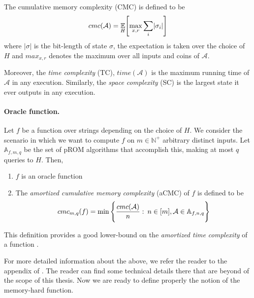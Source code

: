 The cumulative memory complexity (CMC) is defined to be
\begin{equation} \nonumber
    cmc(\mathcal{A}) = \underset{H}{\mathbb{E}} \Bigg{[} \underset{x,r}{\max} \sum_{i} \lvert \sigma_i \rvert \Bigg{]}
\end{equation}
where $\lvert \sigma \rvert$ is the bit-length of state $\sigma$, the expectation is taken over the choice of $H$ and $max_{x,r}$ denotes the maximum over all inputs and coins of $\mathcal{A}$.

Moreover, the \emph{time complexity} (TC), $time(\mathcal{A})$ is the maximum running time of $\mathcal{A}$ in any execution. Similarly, the \emph{space complexity} (SC) is the largest state it ever outputs in any execution.

\paragraph{Oracle function.} Let $f$ be a function over strings depending on the choice of $H$. We consider the scenario in which we want to compute $f$ on $m \in \mathbb{N}^{+}$ arbitrary distinct inputs.
Let $\mathbb{A}_{f,m,q}$ be the set of pROM algorithms that accomplish this, making at most $q$ queries to
$H$. Then,

\begin{enumerate}[label=(\alph*)]
  \item $f$ is an oracle function \\

  \item The \emph{amortized cumulative memory complexity} (aCMC) of $f$ is defined to be
  \begin{equation} \nonumber
      cmc_{m,q}(f) = \min \Bigg{\{} \frac{cmc(\mathcal{A})}{n} : \: n \in [m], \mathcal{A} \in \mathbb{A}_{f,n,q} \Bigg{\}}
  \end{equation}
\end{enumerate}
This definition provides a good lower-bound on the \emph{amortized time complexity} of a function \cite{Alwen:2015:HPC:2746539.2746622}.

For more detailed information about the above, we refer the reader to the appendix of \cite{cryptoeprint:2016:875}. The reader can find some technical details there that are beyond of the scope of this thesis. Now we are ready to define properly the notion of the memory-hard function.



